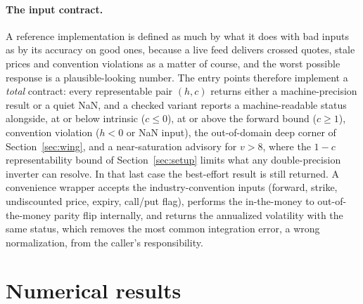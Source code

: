 \documentclass[11pt]{article}
\begin{document}
\paragraph{The input contract.}
A reference implementation is defined as much by what it does with bad inputs as by its accuracy on good ones, because a live feed delivers crossed quotes, stale prices and convention violations as a matter of course, and the worst possible response is a plausible-looking number. The entry points therefore implement a \emph{total} contract: every representable pair $(h,c)$ returns either a machine-precision result or a quiet NaN, and a checked variant reports a machine-readable status alongside, at or below intrinsic ($c\le0$), at or above the forward bound ($c\ge1$), convention violation ($h<0$ or NaN input), the out-of-domain deep corner of Section~\ref{sec:wing}, and a near-saturation advisory for $v>8$, where the $1-c$ representability bound of Section~\ref{sec:setup} limits what any double-precision inverter can resolve. In that last case the best-effort result is still returned. A convenience wrapper accepts the industry-convention inputs (forward, strike, undiscounted price, expiry, call/put flag), performs the in-the-money to out-of-the-money parity flip internally, and returns the annualized volatility with the same status, which removes the most common integration error, a wrong normalization, from the caller's responsibility.

\section{Numerical results}
\label{sec:results}
\end{document}

